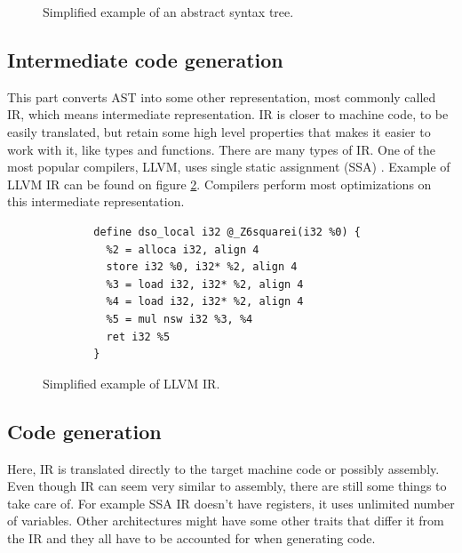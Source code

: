\begin{figure}\label{fig:ast}
    \centering
    \caption{Simplified example of an abstract syntax tree.}
    \label{fig:astgraph}
\end{figure}
 
\subsection{Intermediate code generation}
This part converts AST into some other representation, most commonly called IR,
which means intermediate representation. IR is closer to machine code, to be
easily translated, but retain some high level properties that makes it easier
to work with it, like types and functions. There are many types of IR. One of
the most popular compilers, LLVM, uses single static assignment (SSA)
\cite{llvm}. Example of LLVM IR can be found on figure
\ref{fig:llvm-ir-example}. Compilers perform most optimizations on this
intermediate representation. 

\begin{figure}\label{fig:llvm-ir-example}
    \begin{verbatim}
        define dso_local i32 @_Z6squarei(i32 %0) {
          %2 = alloca i32, align 4
          store i32 %0, i32* %2, align 4
          %3 = load i32, i32* %2, align 4
          %4 = load i32, i32* %2, align 4
          %5 = mul nsw i32 %3, %4
          ret i32 %5
        }
    \end{verbatim}
    \caption{Simplified example of LLVM IR.}
\end{figure}

\subsection{Code generation}
Here, IR is translated directly to the target machine code or possibly
assembly. Even though IR can seem very similar to assembly, there are still
some things to take care of. For example SSA IR doesn't have registers, it uses
unlimited number of variables. Other architectures might have some other traits
that differ it from the IR and they all have to be accounted for when
generating code.

